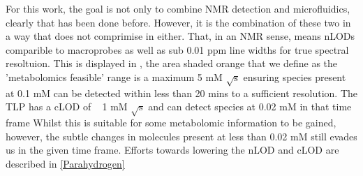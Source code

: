 For this work, the goal is not only to combine NMR detection and microfluidics, clearly that has been done before. However,
it is the combination of these two in a way that does not comprimise in either. That, in an NMR sense, means nLODs
comparible to macroprobes as well as sub 0.01 ppm line widths for true spectral resoltuion. This is displayed in
, the area shaded orange that we define as the 'metabolomics feasible' range is a maximum 5 mM $\sqrt{\text{s}}$
ensuring species present at 0.1 mM can be detected within less than 20 mins to a sufficient resolution. The TLP has a cLOD of
~ 1 mM $\sqrt{\text{s}}$ and can detect species at 0.02 mM in that time frame Whilst this is suitable for some metabolomic information to be
gained, however, the subtle changes in molecules present at less than 0.02 mM still evades us in the given time frame. Efforts towards
lowering the nLOD and cLOD are described in \ref{Parahydrogen}
